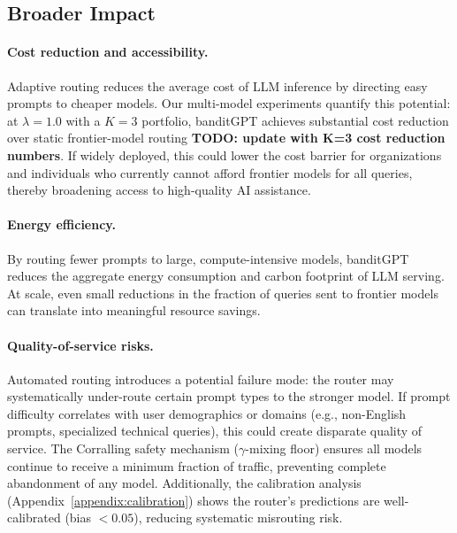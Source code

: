 
\subsection{Broader Impact}
\label{appendix:broader_impact}

\paragraph{Cost reduction and accessibility.}
Adaptive routing reduces the average cost of LLM inference by directing
easy prompts to cheaper models.  Our multi-model experiments quantify this
potential: at $\lambda{=}1.0$ with a $K{=}3$ portfolio, banditGPT achieves
substantial cost reduction over static frontier-model routing
\textbf{TODO: update with K=3 cost reduction numbers}.  If widely deployed, this could lower the cost barrier
for organizations and individuals who currently cannot afford frontier
models for all queries, thereby broadening access to high-quality AI
assistance.

\paragraph{Energy efficiency.}
By routing fewer prompts to large, compute-intensive models, banditGPT
reduces the aggregate energy consumption and carbon footprint of LLM serving.
At scale, even small reductions in the fraction of queries sent to frontier
models can translate into meaningful resource savings.

\paragraph{Quality-of-service risks.}
Automated routing introduces a potential failure mode: the router may
systematically under-route certain prompt types to the stronger model.
If prompt difficulty correlates with user demographics or domains (e.g.,
non-English prompts, specialized technical queries), this could create
disparate quality of service.  The Corralling safety mechanism
($\gamma$-mixing floor) ensures all models continue to receive a minimum
fraction of traffic, preventing complete abandonment of any model.
Additionally, the calibration analysis (Appendix~\ref{appendix:calibration})
shows the router's predictions are well-calibrated (bias $< 0.05$),
reducing systematic misrouting risk.

